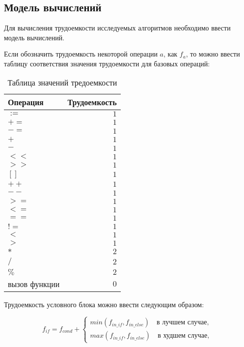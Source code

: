 \subsection{Модель вычислений}
Для вычисления трудоемкости исследуемых алгоритмов необходимо ввести модель вычислений. 

Если обозначить трудоемкость некоторой операции $a$, как $f_a$, то можно ввести таблицу соответствия значения трудоемкости для базовых операций:


\begin{table}[h]
  \caption{\label{table:complexity} Таблица значений тредоемкости}
  \begin{center}
    \begin{tabular}{|l|r|}
      \hline
      Операция & Трудоемкость\\ \hline
      $:=$ & $1$ \\ \hline
      $+=$ & $1$ \\ \hline
      $-=$ & $1$ \\ \hline
      $+$ & $1$ \\ \hline
      $-$ & $1$ \\ \hline
      $<<$ & $1$ \\ \hline
      $>>$ & $1$ \\ \hline
      $[]$ & $1$ \\ \hline
      $++$ & $1$ \\ \hline
      $--$ & $1$ \\ \hline
      $>=$ & $1$ \\ \hline
      $<=$ & $1$ \\ \hline
      $==$ & $1$ \\ \hline
      $!=$ & $1$ \\ \hline
      $<$ & $1$ \\ \hline
      $>$ & $1$ \\ \hline
      $*$ & $2$ \\ \hline
      $/$ & $2$ \\ \hline
      $\%$ & $2$ \\ \hline
      вызов функции & $0$ \\ \hline
    \end{tabular}
  \end{center}
\end{table}

Трудоемкость условного блока можно ввести следующим образом:

\begin{equation}
	f_{if} = f_{cond} + \begin{cases}
		min(f_{in\_if}, f_{in\_else}) \quad \text{в лучшем случае}, \\
		max(f_{in\_if}, f_{in\_else}) \quad \text{в худшем случае},
	\end{cases}
\end{equation}

